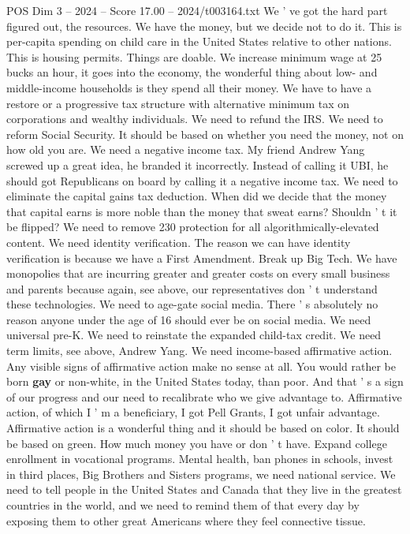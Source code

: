 \begin{textsample}{POS Dim 3 – 2024 – Score 17.00 – 2024/t003164.txt}
We ' ve got the hard part figured out, the resources.
We have the money, but we decide not to do it.
This is per-capita spending on child care in the United States relative to other nations.
This is housing permits.
Things are doable.
We increase minimum wage at 25 bucks an hour, it goes into the economy, the wonderful thing about low- and middle-income households is they spend all their money.
We have to have a restore or a progressive tax structure with alternative minimum tax on corporations and wealthy individuals.
We need to refund the IRS.
We need to reform Social Security.
It should be based on whether you need the money, not on how old you are.
We need a negative income tax.
My friend Andrew Yang screwed up a great idea, he branded it incorrectly.
Instead of calling it UBI, he should got Republicans on board by calling it a negative income tax.
We need to eliminate the capital gains tax deduction.
When did we decide that the money that capital earns is more noble than the money that sweat earns?
Shouldn ' t it be flipped?
We need to remove 230 protection for all algorithmically-elevated content.
We need identity verification.
The reason we can have identity verification is because we have a First Amendment.
Break up Big Tech.
We have monopolies that are incurring greater and greater costs on every small business and parents because again, see above, our representatives don ' t understand these technologies.
We need to age-gate social media.
There ' s absolutely no reason anyone under the age of 16 should ever be on social media.
We need universal pre-K.
We need to reinstate the expanded child-tax credit.
We need term limits, see above, Andrew Yang.
We need income-based affirmative action.
Any visible signs of affirmative action make no sense at all.
You would rather be born \textbf{gay} or non-white, in the United States today, than poor.
And that ' s a sign of our progress and our need to recalibrate who we give advantage to.
Affirmative action, of which I ' m a beneficiary, I got Pell Grants, I got unfair advantage.
Affirmative action is a wonderful thing and it should be based on color.
It should be based on green.
How much money you have or don ' t have.
Expand college enrollment in vocational programs.
Mental health, ban phones in schools, invest in third places, Big Brothers and Sisters programs, we need national service.
We need to tell people in the United States and Canada that they live in the greatest countries in the world, and we need to remind them of that every day by exposing them to other great Americans where they feel connective tissue.

\end{textsample}

